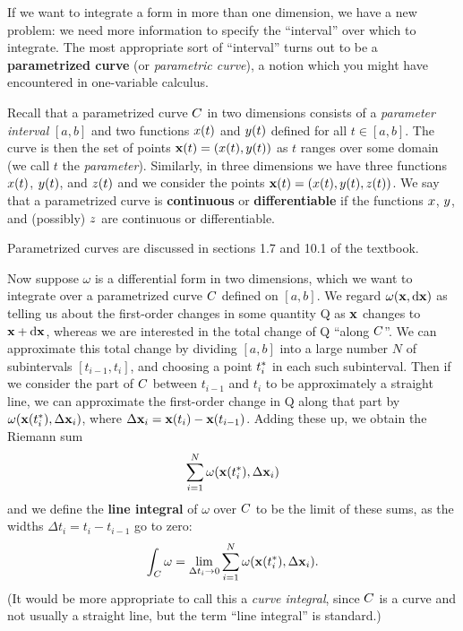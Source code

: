 \documentclass[12pt]{amsart}
\begin{document}
If we want to integrate a form in more than one dimension, we have a new problem: we need more information to specify the ``interval'' over which to integrate.
The most appropriate sort of ``interval'' turns out to be a \textbf{parametrized curve} (or \emph{parametric curve}), a notion which you might have encountered in one-variable calculus.

Recall that a parametrized curve $C$ in two dimensions consists of a \emph{parameter interval} $[a,b]$ and two functions $x(t)$ and $y(t)$ defined for all $t\in [a,b]$.
The curve is then the set of points $\mathbf{x}(t) = (x(t),y(t))$ as $t$ ranges over some domain (we call $t$ the \emph{parameter}).
Similarly, in three dimensions we have three functions $x(t)$, $y(t)$, and $z(t)$ and we consider the points $\mathbf{x}(t) = (x(t),y(t),z(t))$.
We say that a parametrized curve is \textbf{continuous} or \textbf{differentiable} if the functions $x$, $y$, and (possibly) $z$ are continuous or differentiable.
\begin{stewart}Parametrized curves are discussed in sections 1.7 and 10.1 of the textbook.\end{stewart}

Now suppose $\omega$ is a differential form in two dimensions, which we want to integrate over a parametrized curve $C$ defined on $[a,b]$.
We regard $\omega(\mathbf{x},{\mathrm{d} \mathbf{x}})$ as telling us about the first-order changes in some quantity Q as $\mathbf{x}$ changes to $\mathbf{x}+{\mathrm{d} \mathbf{x}}$, whereas we are interested in the total change of Q ``along $C$''.
We can approximate this total change by dividing $[a,b]$ into a large number $N$ of subintervals $[t_{i-1},t_i]$, and choosing a point ${t}_{i}^*$ in each such subinterval.
Then if we consider the part of $C$ between $t_{i-1}$ and $t_i$ to be approximately a straight line, we can approximate the first-order change in Q along that part by $\omega(\mathbf{x}({t}_{i}^*),\Delta \mathbf{x}_i)$, where $\Delta\mathbf{x}_i = \mathbf{x}(t_i)-\mathbf{x}(t_{i-1})$.
Adding these up, we obtain the Riemann sum
\[ \sum_{i=1}^N \omega(\mathbf{x}({t}_{i}^*),\Delta \mathbf{x}_i) \]
and we define the \textbf{line integral} of $\omega$ over $C$ to be the limit of these sums, as the widths $\Delta t_i = t_i - t_{i-1}$ go to zero:
\begin{equation}
  \int_{C} \omega = \lim_{\Delta t_i \to 0} \sum_{i=1}^N \omega(\mathbf{x}({t}_{i}^*),\Delta \mathbf{x}_i).\label{eq:line-integral}
\end{equation}
(It would be more appropriate to call this a \textit{curve integral}, since $C$ is a curve and not usually a straight line, but the term ``line integral'' is standard.)
\end{document}
